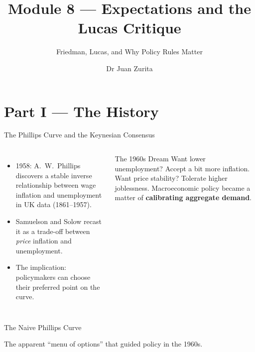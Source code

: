 \documentclass[aspectratio=169, 10pt]{beamer}
\title{Module 8 --- Expectations and the Lucas Critique}
\subtitle{Friedman, Lucas, and Why Policy Rules Matter}
\author{Dr Juan Zurita}
\institute{From Smith to Simulation\\
The University of Edinburgh~$\cdot$~School of Economics}
\date{}
\begin{document}
\maketitle

\section{Part I --- The History}

\begin{frame}{The Phillips Curve and the Keynesian Consensus}
\begin{columns}[T]
\begin{itemize}
  \item 1958: A.~W.~Phillips discovers a stable inverse relationship between
        wage inflation and unemployment in UK data (1861--1957).
  \item Samuelson and Solow recast it as a trade-off between
        \textit{price} inflation and unemployment.
  \item The implication: policymakers can \alert{choose} their preferred
        point on the curve.
\end{itemize}
\begin{block}{The 1960s Dream}
Want lower unemployment? Accept a bit more inflation.
Want price stability? Tolerate higher joblessness.
Macroeconomic policy became a matter of
\textbf{calibrating aggregate demand}.
\end{block}
\end{columns}
\end{frame}

\begin{frame}{The Naive Phillips Curve}
\begin{center}
\end{center}
\vspace{0.3em}
The apparent ``menu of options'' that guided policy in the 1960s.
\end{frame}
\end{document}
